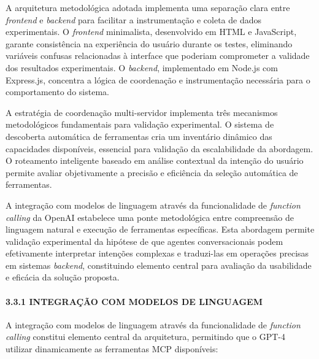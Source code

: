 \documentclass[
]{article}
\begin{document}
A arquitetura metodológica adotada implementa uma separação clara entre
\emph{frontend} e \emph{backend} para facilitar a instrumentação e
coleta de dados experimentais. O \emph{frontend} minimalista,
desenvolvido em HTML e JavaScript, garante consistência na experiência
do usuário durante os testes, eliminando variáveis confusas relacionadas
à interface que poderiam comprometer a validade dos resultados
experimentais. O \emph{backend}, implementado em Node.js com Express.js,
concentra a lógica de coordenação e instrumentação necessária para o
comportamento do sistema.

A estratégia de coordenação multi-servidor implementa três mecanismos
metodológicos fundamentais para validação experimental. O sistema de
descoberta automática de ferramentas cria um inventário dinâmico das
capacidades disponíveis, essencial para validação da escalabilidade da
abordagem. O roteamento inteligente baseado em análise contextual da
intenção do usuário permite avaliar objetivamente a precisão e
eficiência da seleção automática de ferramentas.

A integração com modelos de linguagem através da funcionalidade de
\emph{function calling} da OpenAI estabelece uma ponte metodológica
entre compreensão de linguagem natural e execução de ferramentas
específicas. Esta abordagem permite validação experimental da hipótese
de que agentes conversacionais podem efetivamente interpretar intenções
complexas e traduzi-las em operações precisas em sistemas
\emph{backend}, constituindo elemento central para avaliação da
usabilidade e eficácia da solução proposta.

\paragraph{3.3.1 INTEGRAÇÃO COM MODELOS DE
LINGUAGEM}\label{integrauxe7uxe3o-com-modelos-de-linguagem}

A integração com modelos de linguagem através da funcionalidade de
\emph{function calling} constitui elemento central da arquitetura,
permitindo que o GPT-4 utilizar dinamicamente as ferramentas MCP
disponíveis:
\end{document}
